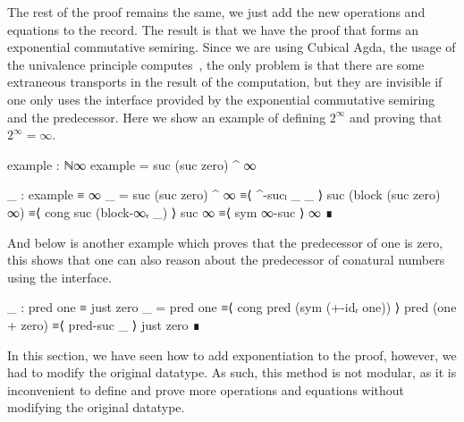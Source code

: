 The rest of the proof remains the same, we just add the new operations and
equations to the  record. The result is that we have the proof
that  forms an exponential commutative semiring. Since we are
using Cubical Agda, the usage of the univalence principle
computes~\cite{vezzosi-cubical}, the only problem is that there are some
extraneous transports in the result of the computation, but they are invisible
if one only uses the interface provided by the exponential commutative semiring
and the predecessor. Here we show an example of defining $2^\infty$ and proving
that $2^\infty = \infty$.
\begin{code}
  example : ℕ∞
  example = suc (suc zero) ^ ∞

  _ : example ≡ ∞
  _ =
    suc (suc zero) ^ ∞        ≡⟨ ^-sucₗ _ _ ⟩
    suc (block (suc zero) ∞)  ≡⟨ cong suc (block-∞ᵣ _) ⟩
    suc ∞                     ≡⟨ sym ∞-suc ⟩
    ∞                         ∎
\end{code}
And below is another example which proves that the predecessor of one is zero,
this shows that one can also reason about the predecessor of conatural numbers
using the interface.
\begin{code}
  _ : pred one ≡ just zero
  _ =
    pred one           ≡⟨ cong pred (sym (+-idᵣ one)) ⟩
    pred (one + zero)  ≡⟨ pred-suc _ ⟩
    just zero          ∎
\end{code}

In this section, we have seen how to add exponentiation to the proof, however,
we had to modify the original  datatype. As such, this method
is not modular, as it is inconvenient to define and prove more operations and
equations without modifying the original datatype.
